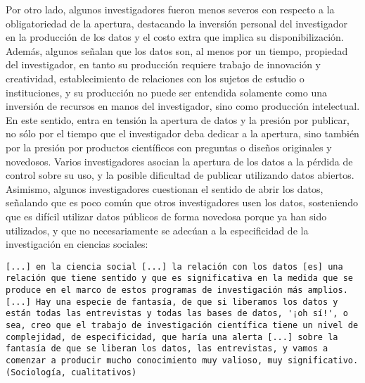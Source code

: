 \documentclass[
  letterpaper,
  DIV=11,
  numbers=noendperiod]{scrreprt}
\begin{document}
Por otro lado, algunos investigadores fueron menos severos con respecto
a la obligatoriedad de la apertura, destacando la inversión personal del
investigador en la producción de los datos y el costo extra que implica
su disponibilización. Además, algunos señalan que los datos son, al
menos por un tiempo, propiedad del investigador, en tanto su producción
requiere trabajo de innovación y creatividad, establecimiento de
relaciones con los sujetos de estudio o instituciones, y su producción
no puede ser entendida solamente como una inversión de recursos en manos
del investigador, sino como producción intelectual. En este sentido,
entra en tensión la apertura de datos y la presión por publicar, no sólo
por el tiempo que el investigador deba dedicar a la apertura, sino
también por la presión por productos científicos con preguntas o diseños
originales y novedosos. Varios investigadores asocian la apertura de los
datos a la pérdida de control sobre su uso, y la posible dificultad de
publicar utilizando datos abiertos. Asimismo, algunos investigadores
cuestionan el sentido de abrir los datos, señalando que es poco común
que otros investigadores usen los datos, sosteniendo que es difícil
utilizar datos públicos de forma novedosa porque ya han sido utilizados,
y que no necesariamente se adecúan a la especificidad de la
investigación en ciencias sociales:

\begin{verbatim}
[...] en la ciencia social [...] la relación con los datos [es] una relación que tiene sentido y que es significativa en la medida que se produce en el marco de estos programas de investigación más amplios. [...] Hay una especie de fantasía, de que si liberamos los datos y están todas las entrevistas y todas las bases de datos, '¡oh sí!', o sea, creo que el trabajo de investigación científica tiene un nivel de complejidad, de especificidad, que haría una alerta [...] sobre la fantasía de que se liberan los datos, las entrevistas, y vamos a comenzar a producir mucho conocimiento muy valioso, muy significativo. (Sociología, cualitativos)
\end{verbatim}
\end{document}

